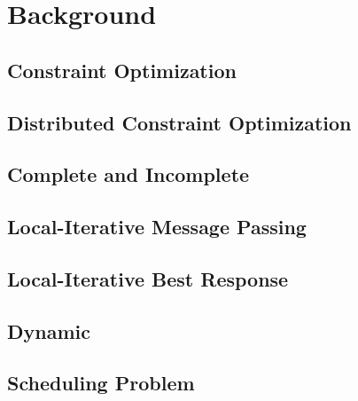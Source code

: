 \chapter{Background}
\section{Constraint Optimization}
\section{Distributed Constraint Optimization}
\section{Complete and Incomplete}
\section{Local-Iterative Message Passing}
\section{Local-Iterative Best Response}
\section{Dynamic}
\section{Scheduling Problem}